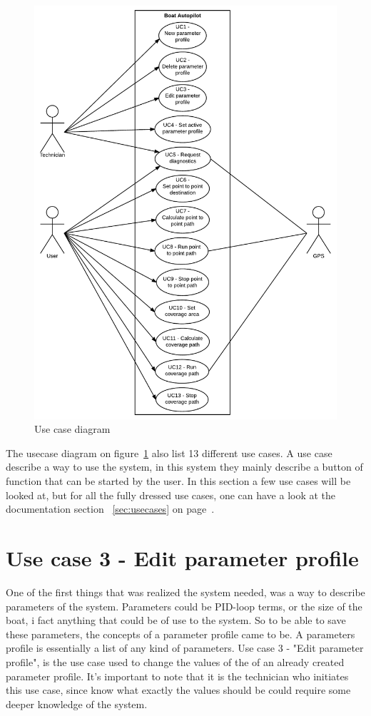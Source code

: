 \begin{figure}[h]
\centering
\includegraphics[width=0.7\linewidth]{../Appendix/Project/Dokumentation/Images/Requirements_specification/Usecase_diagram}
\caption{Use case diagram}
\label{fig:usecasediagram}
\end{figure}

The usecase diagram on figure~\ref{fig:usecasediagram} also list 13 different use cases. A use case describe a way to use the system, in this system they mainly describe a button of function that can be started by the user. In this section a few use cases will be looked at, but for all the fully dressed use cases, one can have a look at the documentation section ~\ref{sec:usecases} on page~\pageref{sec:usecases}.

\section{Use case 3 - Edit parameter profile}
One of the first things that was realized the system needed, was a way to describe parameters of the system. Parameters could be PID-loop terms, or the size of the boat, i fact anything that could be of use to the system. So to be able to save these parameters, the concepts of a parameter profile came to be. A parameters profile is essentially a list of any kind of parameters. Use case 3 - "Edit parameter profile", is the use case used to change the values of the of an already created parameter profile. It's important to note that it is the technician who initiates this use case, since know what exactly the values should be could require some deeper knowledge of the system. 

